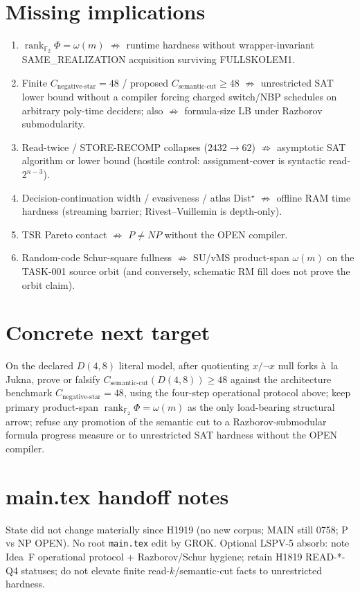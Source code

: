 \documentclass[11pt]{article}
\begin{document}
\section*{Missing implications}
\begin{enumerate}
\item $\operatorname{rank}_{\mathbb F_2}\Phi=\omega(m)$ $\not\Rightarrow$ runtime hardness without
  wrapper-invariant SAME\_REALIZATION acquisition surviving FULLSKOLEM1.
\item Finite $C_{\mathrm{negative\textrm{-}star}}=48$ / proposed $C_{\mathrm{semantic\textrm{-}cut}}\ge48$
  $\not\Rightarrow$ unrestricted SAT lower bound without a compiler forcing charged switch/NBP
  schedules on arbitrary poly-time deciders; also $\not\Rightarrow$ formula-size LB under
  Razborov submodularity.
\item Read-twice / STORE-RECOMP collapses ($2432\to62$) $\not\Rightarrow$ asymptotic SAT algorithm
  or lower bound (hostile control: assignment-cover is syntactic read-$2^{n-3}$).
\item Decision-continuation width / evasiveness / atlas Dist$^\star$ $\not\Rightarrow$ offline
  RAM time hardness (streaming barrier; Rivest--Vuillemin is depth-only).
\item TSR Pareto contact $\not\Rightarrow$ $P\neq NP$ without the OPEN compiler.
\item Random-code Schur-square fullness $\not\Rightarrow$ SU/vMS product-span $\omega(m)$ on the
  TASK-001 source orbit (and conversely, schematic RM fill does not prove the orbit claim).
\end{enumerate}

\section*{Concrete next target}
On the declared $D(4,8)$ literal model, after quotienting $x/\neg x$ null forks \`a~la Jukna,
prove or falsify $C_{\mathrm{semantic\textrm{-}cut}}(D(4,8))\ge 48$ against the architecture
benchmark $C_{\mathrm{negative\textrm{-}star}}=48$, using the four-step operational protocol
above; keep primary product-span $\operatorname{rank}_{\mathbb F_2}\Phi=\omega(m)$ as the only
load-bearing structural arrow; refuse any promotion of the semantic cut to a Razborov-submodular
formula progress measure or to unrestricted SAT hardness without the OPEN compiler.

\section*{main.tex handoff notes}
State did not change materially since H1919 (no new corpus; MAIN still 0758; P vs NP OPEN).
No root \texttt{main.tex} edit by GROK. Optional LSPV-5 absorb: note Idea~F operational
protocol + Razborov/Schur hygiene; retain H1819 READ-*-Q4 statuses; do not elevate finite
read-$k$/semantic-cut facts to unrestricted hardness.

\end{document}
